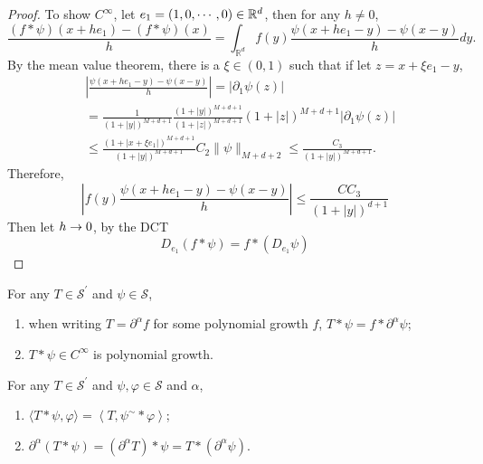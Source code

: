 \begin{enumerate}
\begin{proof}
		\noindent To show $C^\infty$, let $e_1=(1,0,\cdots,0) \in \mathbb{R}^d$, then for any $h \neq 0$,
		\begin{equation*}
			\frac{(f * \psi)\left(x+h e_1\right)-(f * \psi)(x)}{h}=\int_{\mathbb{R}^d} f(y) \frac{\psi\left(x+h e_1-y\right)-\psi(x-y)}{h} d y .
		\end{equation*}
		By the mean value theorem, there is a $\xi \in (0,1)$ such that if let $z=x+\xi e_1-y$,
		\begin{equation*}
			\begin{aligned}
				& \left|\frac{\psi\left(x+h e_1-y\right)-\psi(x-y)}{h}\right|=\left|\partial_1 \psi(z)\right| \\
				& =\frac{1}{(1+|y|)^{M+d+1}} \frac{(1+|y|)^{M+d+1}}{(1+|z|)^{M+d+1}}(1+|z|)^{M+d+1}\left|\partial_1 \psi(z)\right| \\
				& \leq \frac{\left(1+\left|x+\xi e_1\right|\right)^{M+d+1}}{(1+|y|)^{M+d+1}} C_2\|\psi\|_{M+d+2} \leq \frac{C_3}{(1+|y|)^{M+d+1}} .
			\end{aligned}
		\end{equation*}
		Therefore,
		\begin{equation*}
			\left|f(y) \frac{\psi\left(x+h e_1-y\right)-\psi(x-y)}{h}\right| \leq \frac{C C_3}{(1+|y|)^{d+1}}
		\end{equation*}
		Then let $h \rightarrow 0$, by the DCT
		\begin{equation*}
			D_{e_1}(f * \psi) = f * (D_{e_1}\psi)
		\end{equation*}
	\end{proof}

	\begin{prop}
		For any $T \in \mathcal{S}^\prime$ and $\psi \in \mathcal{S}$,
		\begin{enumerate}
			\item when writing $T = \partial^\alpha f$ for some polynomial growth $f$, $T * \psi = f * \partial^\alpha \psi$;
			\item $T * \psi \in C^\infty$ is polynomial growth.
		\end{enumerate}
	\end{prop}

	\begin{prop}
		For any $T \in \mathcal{S}^\prime$ and $\psi,\varphi \in \mathcal{S}$ and $\alpha$,
		\begin{enumerate}
			\item $\langle T * \psi, \varphi\rangle=\left\langle T, \psi^{\sim} * \varphi\right\rangle$;
			\item $\partial^\alpha(T * \psi)=\left(\partial^\alpha T\right) * \psi=T *\left(\partial^\alpha \psi\right)$.
		\end{enumerate}
	\end{prop}


\end{enumerate}
